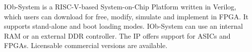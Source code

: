 %

IOb-System is a RISC-V-based System-on-Chip Platform written in Verilog, which
users can download for free, modify, simulate and implement in FPGA. It supports
stand-alone and boot loading modes. IOb-System can use an internal RAM or an
external DDR controller. The IP offers support for ASICs and FPGAs. Licensable
commercial versions are available.
